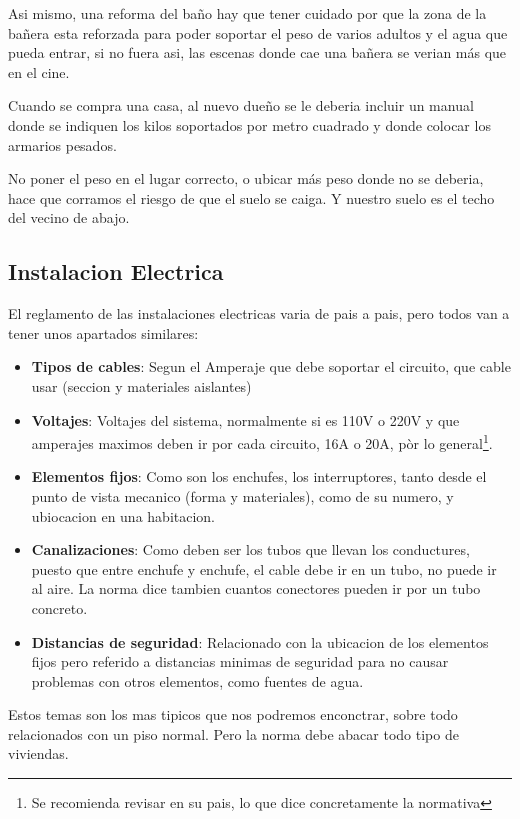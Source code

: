 Asi mismo, una reforma del baño hay que tener cuidado por que la zona de la bañera esta reforzada para poder soportar el peso de varios adultos y el agua que pueda entrar, si no fuera asi, las escenas donde cae una bañera se verian más que en el cine.

Cuando se compra una casa, al nuevo dueño se le deberia incluir un manual donde se indiquen los kilos soportados por metro cuadrado y donde colocar los armarios pesados.

No poner el peso en el lugar correcto, o ubicar más peso donde no se deberia, hace que corramos el riesgo de que el suelo se caiga. Y nuestro suelo es el techo del vecino de abajo.
\subsection{Instalacion Electrica}
El reglamento de las instalaciones electricas varia de pais a pais, pero todos van a tener unos apartados similares:
\begin{itemize}
	\item \textbf{Tipos de cables}: Segun el Amperaje que debe soportar el circuito, que cable usar (seccion y materiales aislantes)
	\item \textbf{Voltajes}: Voltajes del sistema, normalmente si es 110V o 220V y que amperajes maximos deben ir por cada circuito, 16A o 20A, pòr lo general\footnote{Se recomienda revisar en su pais, lo que dice concretamente la normativa}.
	\item \textbf{Elementos fijos}: Como son los enchufes, los interruptores, tanto desde el punto de vista mecanico (forma y materiales), como de su numero, y ubiocacion en una habitacion. 
	\item \textbf{Canalizaciones}: Como deben ser los tubos que llevan los conductures, puesto que entre enchufe y enchufe, el cable debe ir en un tubo, no puede ir al aire. La norma dice tambien cuantos conectores pueden ir por un tubo concreto.
	\item \textbf{Distancias de seguridad}: Relacionado con la ubicacion de los elementos fijos  pero referido a distancias minimas de seguridad para no causar problemas con otros elementos, como fuentes de agua.
\end{itemize}
Estos temas son los mas tipicos que nos podremos enconctrar, sobre todo relacionados con un piso normal. Pero la norma debe abacar todo tipo de viviendas.

